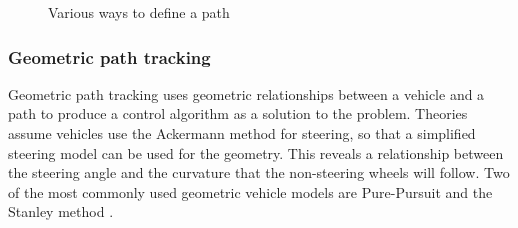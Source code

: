 \documentclass[main.tex]{subfiles}
\begin{document}
\begin{figure}[htbp]
\centering
{}\hspace{1em}%
\hspace{1em}%
\caption[Various ways to define a path]{Various ways to define a path \parencite{Giesbrecht2005}}
\end{figure}

\subsubsection{Geometric path tracking}
Geometric path tracking uses geometric relationships between a vehicle and a path to produce a control algorithm as a solution to the problem. Theories assume vehicles use the Ackermann method for steering, so that a simplified steering model can be used for the geometry. This reveals a relationship between the steering angle and the curvature that the non-steering wheels will follow. Two of the most commonly used geometric vehicle models are Pure-Pursuit and the Stanley method \parencite{snider2009}.
\end{document}
